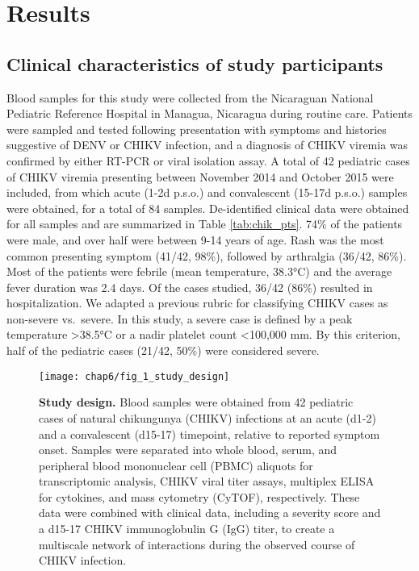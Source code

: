 \section{Results}

\subsection{Clinical characteristics of study participants}

Blood samples for this study were collected from the Nicaraguan National Pediatric Reference Hospital in Managua, Nicaragua during routine care. Patients were sampled and tested following presentation with symptoms and histories suggestive of DENV or CHIKV infection, and a diagnosis of CHIKV viremia was confirmed by either RT-PCR or viral isolation assay. A total of 42 pediatric cases of CHIKV viremia presenting between November 2014 and October 2015 were included, from which acute (1-2d p.s.o.) and convalescent (15-17d p.s.o.) samples were obtained, for a total of 84 samples.
De-identified clinical data were obtained for all samples and are summarized in Table \ref{tab:chik_pts}. 74\% of the patients were male, and over half were between 9-14 years of age. Rash was the most common presenting symptom (41/42, 98\%), followed by arthralgia (36/42, 86\%). Most of the patients were febrile (mean temperature, 38.3°C) and the average fever duration was 2.4 days. Of the cases studied, 36/42 (86\%) resulted in hospitalization. We adapted a previous rubric for classifying CHIKV cases as non-severe vs.\ severe.\autocite{Chow2011,Ng2009} In this study, a severe case is defined by a peak temperature >38.5°C or a nadir platelet count <100,000 mm. By this criterion, half of the pediatric cases (21/42, 50\%) were considered severe.

\begin{figure}[htb]
  \texttt{[image: chap6/fig\_1\_study\_design]}
  \caption[Chikungunya immune profiling study design]{\textbf{Study design.} Blood samples were obtained from 42 pediatric cases of natural chikungunya (CHIKV) infections at an acute (d1-2) and a convalescent (d15-17) timepoint, relative to reported symptom onset. Samples were separated into whole blood, serum, and peripheral blood mononuclear cell (PBMC) aliquots for transcriptomic analysis, CHIKV viral titer assays, multiplex ELISA for cytokines, and mass cytometry (CyTOF), respectively. These data were combined with clinical data, including a severity score and a d15-17 CHIKV immunoglobulin G (IgG) titer, to create a multiscale network of interactions during the observed course of CHIKV infection.
  }
  \label{fig:chik_study_design}
\end{figure}

